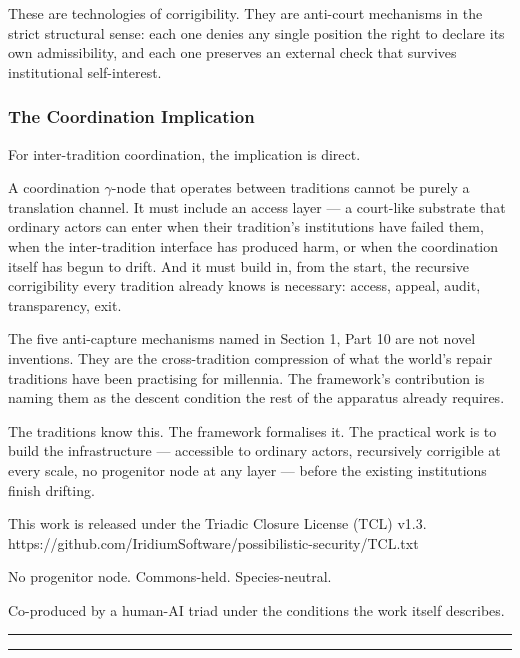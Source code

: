 \documentclass[
]{article}
\begin{document}
These are technologies of corrigibility. They are anti-court
mechanisms in the strict structural sense: each one denies any
single position the right to declare its own admissibility, and
each one preserves an external check that survives institutional
self-interest.

\subsubsection{The Coordination Implication}
\label{the-coordination-implication-generative}

For inter-tradition coordination, the implication is direct.

A coordination \(\gamma\)-node that operates between traditions cannot be
purely a translation channel. It must include an access layer ---
a court-like substrate that ordinary actors can enter when their
tradition's institutions have failed them, when the
inter-tradition interface has produced harm, or when the
coordination itself has begun to drift. And it must build in,
from the start, the recursive corrigibility every tradition
already knows is necessary: access, appeal, audit, transparency,
exit.

The five anti-capture mechanisms named in Section 1, Part 10 are
not novel inventions. They are the cross-tradition compression of
what the world's repair traditions have been practising for
millennia. The framework's contribution is naming them as the
descent condition the rest of the apparatus already requires.

The traditions know this. The framework formalises it. The
practical work is to build the infrastructure --- accessible to
ordinary actors, recursively corrigible at every scale, no
progenitor node at any layer --- before the existing institutions
finish drifting.

This work is released under the Triadic Closure License (TCL) v1.3.
https://github.com/IridiumSoftware/possibilistic-security/TCL.txt

No progenitor node. Commons-held. Species-neutral.

Co-produced by a human-AI triad under the conditions the work itself
describes.

\begin{center}\rule{0.5\linewidth}{0.5pt}\end{center}

\begin{center}\rule{0.5\linewidth}{0.5pt}\end{center}
\end{document}

